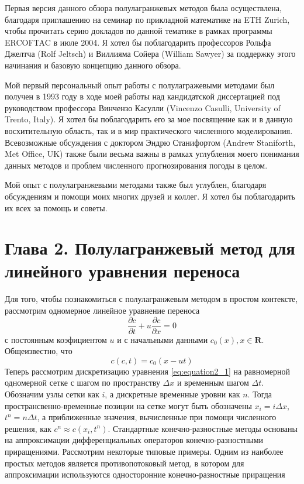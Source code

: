 Первая версия данного обзора полулагранжевых методов была осуществлена, благодаря приглашению на семинар по прикладной математике на ETH Zurich, чтобы прочитать серию докладов по данной тематике в рамках программы ERCOFTAC в июле 2004. Я хотел бы поблагодарить профессоров Рольфа Джелтча (Rolf Jeltsch) и Виллияма Сойера (William Sawyer) за поддержку этого начинания и базовую концепцию данного обзора.

Мой первый персональный опыт работы с полулагражевыми методами был получен в 1993 году в ходе моей работы над кандидатской диссертацией под руководством профессора Винчензо Касулли (Vincenzo Casulli, University of Trento, Italy). Я хотел бы поблагодарить его за мое посвящение как и в данную восхитительную область, так и в мир практического численного моделирования. Всевозможные обсуждения с доктором Эндрю Станифортом (Andrew Staniforth, Met Office, UK) также были весьма важны в рамках углубления моего понимания данных методов и  проблем численного прогнозирования погоды в целом.

Мой опыт с полулагранжевыми методами также был углублен, благодаря обсуждениям и помощи моих многих друзей и коллег. Я хотел бы поблагодарить их всех за помощь и советы.

\newpage

\chapter*{Глава 2. Полулагранжевый метод для линейного уравнения переноса} \label{chapt_2}
Для того, чтобы познакомиться с полулагранжевым методом в простом контексте, рассмотрим одномерное линейное уравнение переноса
%
\begin{equation}
\label{eq:equation2_1}
\frac{\partial c}{\partial t} + u\frac{\partial c}{\partial x} = 0
\end{equation}
%
с постоянным коэфициентом $u$ и с начальными данными $c_0(x), x\in{\mathbf{R}}$. Общеизвестно, что
%
\begin{equation}
\label{eq:equation2_2}
c(c,t)=c_0(x - ut)
\end{equation}
%
Теперь рассмотрим дискретизацию уравнения \eqref{eq:equation2_1} на равномерной одномерной сетке с шагом по пространству $\Delta x$ и временным шагом $\Delta t$. Обозначим узлы сетки как $i$, а дискретные временные уровни как $n$. Тогда пространсвенно-временные позиции на сетке могут быть обозначены $x_i=i\Delta{x}$, $t^n=n\Delta{t}$, а приближенные значения, вычисленные при помощи численного решения, как $c^n\approx c(x_i, t^n)$. Стандартные конечно-разностные методы основаны на аппроксимации дифференциальных операторов конечно-разностными приращениями. Рассмотрим некоторые типовые примеры. Одним из наиболее простых методов является противопотоковый метод, в котором для аппроксимации используются односторонние конечно-разностные приращения

